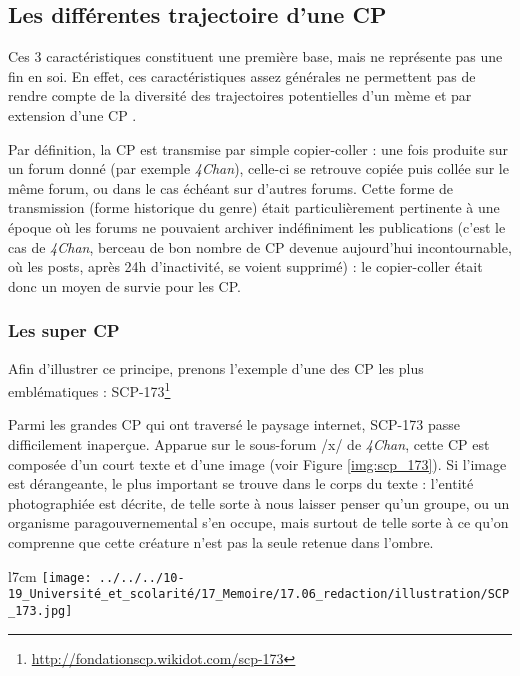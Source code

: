 \documentclass[12pt,a4paper,oneside,titlepage]{book} %
\begin{document}
	\subsection{Les différentes trajectoire d'une CP}
	
	Ces 3 caractéristiques constituent une première base, mais ne représente pas une fin en soi. En effet, ces caractéristiques assez générales ne permettent pas de rendre compte de la diversité des trajectoires potentielles d’un mème et par extension d’une CP .
	
	Par définition, la CP est transmise par simple copier-coller : une fois produite sur un forum donné (par exemple \emph{4Chan}), celle-ci se retrouve copiée puis collée sur le même forum, ou dans le cas échéant sur d’autres forums. Cette forme de transmission (forme historique du genre) était particulièrement pertinente à une époque où les forums ne pouvaient archiver indéfiniment les publications (c’est le cas de \emph{4Chan}, berceau de bon nombre de CP devenue aujourd’hui incontournable, où les posts, après 24h d'inactivité, se voient supprimé) : le copier-coller était donc un moyen de survie pour les CP. 
	
	\subsubsection{Les super CP}
	
	Afin d'illustrer ce principe, prenons l'exemple d'une des CP les plus emblématiques : SCP-173\footnote{\url{http://fondationscp.wikidot.com/scp-173}}
	
	Parmi les grandes CP qui ont traversé le paysage internet, SCP-173 passe difficilement inaperçue. Apparue sur le sous-forum /x/ de \emph{4Chan}, cette CP est composée d'un court texte et d'une image (voir Figure \ref{img:scp_173}). Si l'image est dérangeante, le plus important se trouve dans le corps du texte : l'entité photographiée est décrite, de telle sorte à nous laisser penser qu'un groupe, ou un organisme paragouvernemental s'en occupe, mais surtout de telle sorte à ce qu’on comprenne que cette créature n'est pas la seule retenue dans l’ombre. 

		\begin{wrapfigure}{l}{7cm}
		\centering
		\texttt{[image: ../../../10-19\_Université\_et\_scolarité/17\_Memoire/17.06\_redaction/illustration/SCP\_173.jpg]}
		
		\caption{\small \emph{Untitled 2004} créée par Izumi Kato. Cette photographie a été prise par Keisuke Yamamoto.}
		\label{img:scp_173}
	\end{wrapfigure}
	
\end{document}
